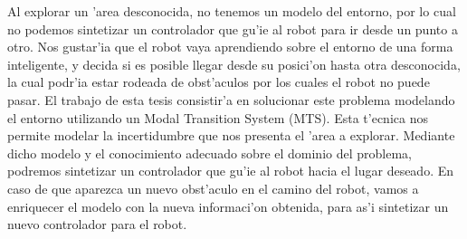 \documentclass{article}
\begin{document}
Al explorar un 'area desconocida, no tenemos un modelo del entorno, por lo cual no podemos sintetizar un controlador que gu'ie al robot para ir desde un punto a otro. Nos gustar'ia que el robot vaya aprendiendo sobre el entorno de una forma inteligente, y decida si es posible llegar desde su posici'on hasta otra desconocida, la cual podr'ia estar rodeada de obst'aculos por los cuales el robot no puede pasar. El trabajo de esta tesis consistir'a en solucionar este problema modelando el entorno utilizando un Modal Transition System (MTS). Esta t'ecnica nos permite modelar la incertidumbre que nos presenta el 'area a explorar. Mediante dicho modelo y el conocimiento adecuado sobre el dominio del problema, podremos sintetizar un controlador que gu'ie al robot hacia el lugar deseado. En caso de que aparezca un nuevo obst'aculo en el camino del robot, vamos a enriquecer el modelo con la nueva informaci'on obtenida, para as'i sintetizar un nuevo controlador para el robot.
\end{document}
